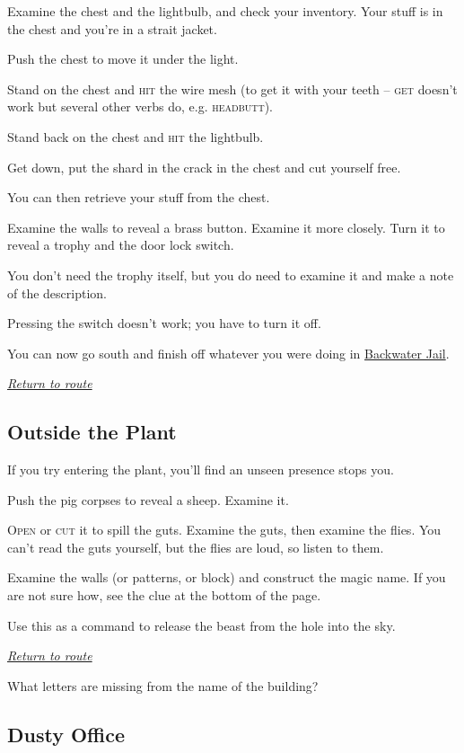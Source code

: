\documentclass[a5paper]{extarticle}
\begin{document}
Examine the chest and the lightbulb, and check your inventory.
Your stuff is in the chest and you're in a strait jacket.

Push the chest to move it under the light.

Stand on the chest and \textsc{hit} the wire mesh (to get it with your teeth
-- \textsc{get} doesn't work but several other verbs do, e.g. \textsc{headbutt}).

Stand back on the chest and \textsc{hit} the lightbulb.

Get down, put the shard in the crack in the chest and cut yourself free.

You can then retrieve your stuff from the chest.

Examine the walls to reveal a brass button. Examine it more closely.
Turn it to reveal a trophy and the door lock switch.

You don't need the trophy itself, but you do need to examine it and make a note
of the description.

Pressing the switch doesn't work; you have to turn it off.

You can now go south and finish off whatever you were doing in
\hyperref[sec:req-Backwater-Jail]{Backwater Jail}.

\hyperref[sec:route-2]{\emph{Return to route}}

\newpage
\subsection{Outside the Plant}\label{sec:sol-Outside-the-Plant}

If you try entering the plant, you'll find an unseen presence stops you.

Push the pig corpses to reveal a sheep. Examine it.

\textsc{Open} or \textsc{cut} it to spill the guts.
Examine the guts, then examine the flies.
You can't read the guts yourself, but the flies are loud, so listen to them.

Examine the walls (or patterns, or block) and construct the magic name.
If you are not sure how, see the clue at the bottom of the page.

Use this as a command to release the beast from the hole into the sky.

\hyperref[sec:route-3]{\emph{Return to route}}

\vfill
What letters are missing from the name of the building?

\newpage
\subsection{Dusty Office}\label{sec:sol-Dusty-Office}
\end{document}
